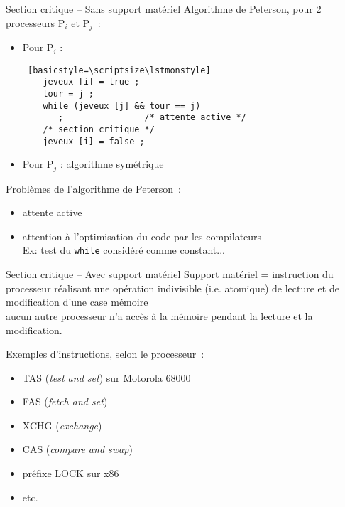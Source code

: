 \begin {frame} [fragile] {Section critique -- Sans support matériel}
    Algorithme de Peterson, pour 2 processeurs P$_i$ et P$_j$~:

    \begin {itemize}
	\item Pour P$_i$ :
    \begin {lstlisting} [basicstyle=\scriptsize\lstmonstyle]
    jeveux [i] = true ;
    tour = j ;
    while (jeveux [j] && tour == j)
       ;                /* attente active */
    /* section critique */
    jeveux [i] = false ;
    \end{lstlisting}

	\item Pour P$_j$ : algorithme symétrique
    \end {itemize}

    \vspace* {3mm}
    Problèmes de l'algorithme de Peterson~:
    \begin {itemize}
	\item attente active

	\item attention à l'optimisation du code par les compilateurs \\
	    Ex: test du \texttt {while} considéré comme constant...
    \end {itemize}

\end{frame}

\begin {frame} {Section critique -- Avec support matériel}
    Support matériel = instruction du processeur réalisant une
    opération indivisible (i.e. atomique) de lecture et de modification
    d'une case mémoire
    \\
    \implique aucun autre processeur n'a accès à la mémoire pendant
    la lecture et la modification.

    \vspace* {3mm}

    Exemples d'instructions, selon le processeur~:
    \begin {itemize}
	\item TAS (\emph {test and set}) sur Motorola 68000
	\item FAS (\emph {fetch and set})
	\item XCHG (\emph {exchange})
	\item CAS (\emph {compare and swap})
	\item préfixe LOCK sur x86
	\item etc.
    \end {itemize}

\end {frame}

